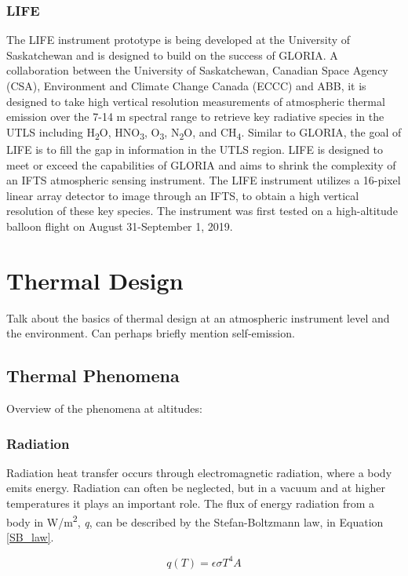 \subsubsection{LIFE}
The LIFE instrument prototype is being developed at the University of Saskatchewan and is designed to build on the success of GLORIA.  A collaboration between the University of Saskatchewan, Canadian Space Agency (CSA), Environment and Climate Change Canada (ECCC) and ABB, it is designed to take high vertical resolution measurements of atmospheric thermal emission over the 7-14 \textmu m spectral range to retrieve key radiative species in the UTLS including H\textsubscript{2}O, HNO\textsubscript{3}, O\textsubscript{3}, N\textsubscript{2}O, and CH\textsubscript{4}. Similar to GLORIA, the goal of LIFE is to fill the gap in information in the UTLS region. LIFE is designed to meet or exceed the capabilities of GLORIA and aims to shrink the complexity of an IFTS atmospheric sensing instrument. The LIFE instrument utilizes a 16-pixel linear array detector to image through an IFTS, to obtain a high vertical resolution of these key species. The instrument was first tested on a high-altitude balloon flight on August 31-September 1, 2019.

\section{Thermal Design}
Talk about the basics of thermal design at an atmospheric instrument level and the environment. Can perhaps briefly mention self-emission.

\subsection{Thermal Phenomena}
Overview of the phenomena at altitudes:

\subsubsection{Radiation}
Radiation heat transfer occurs through electromagnetic radiation, where a body emits energy. Radiation can often be neglected, but in a vacuum and at higher temperatures it plays an important role. The flux of energy radiation from a body in W/m\textsuperscript{2}, \textit{q}, can be described by the Stefan-Boltzmann law, in Equation \ref{SB_law}.

\begin{equation} \label{SB_law}
    q(T) = \epsilon \sigma T^{4}A
\end{equation}

